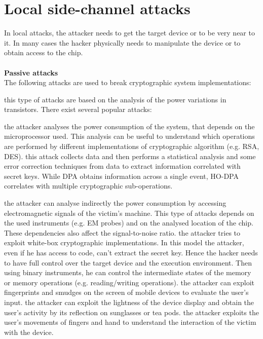 \section{Local side-channel attacks}
In local attacks, the attacker needs to get the target device or to be very near to it. In many cases the hacker physically needs to manipulate the device or to obtain access to the chip.\\\\
\textbf{Passive attacks}\\
The following attacks are used to break cryptographic system implementations:
\begin{itemize}
{this type of attacks are based on the analysis of the power variations in transistors. There exist several popular attacks\cite{intro_DPA}:
\begin{itemize}
{the attacker analyses the power consumption of the system, that depends on the microprocessor used. This analysis can be useful to understand which operations are performed by different implementations of cryptographic algorithm (e.g. RSA, DES).}
{this attack collects data and then performs a statistical analysis and some error correction techniques from data to extract information correlated with secret keys.}
{While DPA obtains information across a single event, HO-DPA correlates with multiple cryptographic sub-operations.}
\end{itemize}}
{the attacker can analyse indirectly the power consumption by accessing electromagnetic signals of the victim's machine. This type of attacks depends on the used instruments (e.g. EM probes) and on the analysed location of the chip. These dependencies also affect the signal-to-noise ratio.}
{the attacker tries to exploit white-box cryptographic implementations. In this model the attacker, even if he has access to code, can't extract the secret key. Hence the hacker needs to have full control over the target device and the execution environment. Then using binary instruments, he can control the intermediate states of the memory or memory operations (e.g. reading/writing operations)\cite{side_DCA}.}
{the attacker can exploit fingerprints and smudges on the screen of mobile devices to evaluate the user's input.}
{the attacker can exploit the lightness of the device display and obtain the user's activity by its reflection on sunglasses or tea pods.}
{the attacker exploits the user's movements of fingers and hand to understand the interaction of the victim with the device.}
\end{itemize}
